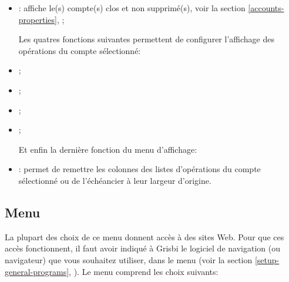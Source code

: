 \begin{itemize}
	\item {}: affiche le(s) compte(s) clos et non supprimé(s), voir la section \vref{accounts-properties}, ;
\begin{addmargin*}[-10pt]{0cm} 	%
	Les quatres fonctions suivantes permettent de configurer l'affichage des opérations du compte sélectionné:
\end{addmargin*}
	\item {};
	\item {};
	\item {};
	\item {};
\begin{addmargin*}[-10pt]{0cm} 	%
	Et enfin la dernière fonction du menu d'affichage:
\end{addmargin*}	
	\item {}: permet de remettre les colonnes des listes d'opérations du compte sélectionné ou de l'échéancier à leur largeur d'origine.
\end{itemize}

\subsection{Menu \label{home-menus-help}}

La plupart des choix de ce menu donnent accès à des sites Web. Pour que ces accès fonctionnent, il faut avoir indiqué à Grisbi le logiciel de navigation (ou navigateur) que vous souhaitez utiliser, dans le menu  (voir la section \vref{setup-general-programs}, ). Le menu  comprend les choix suivants:

